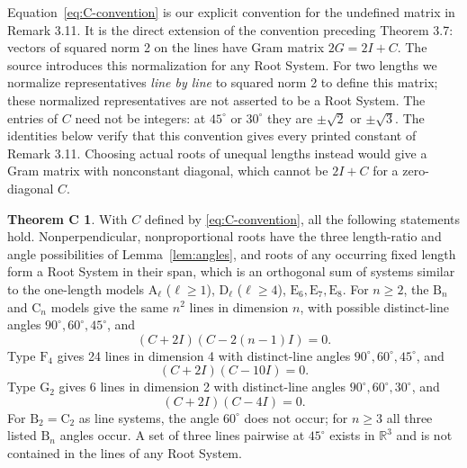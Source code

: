 \documentclass[11pt]{amsart}
\newcommand\re{{\mathbb R}}%
\theoremstyle{definition}
\newtheorem*{theoremC}{Theorem C}
\newcommand{\typ}[1]{\mathrm{#1}}
\begin{document}
Equation~\eqref{eq:C-convention} is our explicit convention for the
undefined matrix in Remark 3.11. It is the direct extension of the
convention preceding Theorem 3.7: vectors of squared norm 2 on the lines
have Gram matrix $2G=2I+C$. The source introduces this normalization
for any Root System. For two lengths we normalize representatives
\emph{line by line} to squared norm 2 to define this matrix; these
normalized representatives are not asserted to be a Root System.
The entries of $C$ need not be integers: at $45^\circ$ or $30^\circ$
they are $\pm\sqrt2$ or $\pm\sqrt3$. The identities below verify that
this convention gives every printed constant of Remark 3.11.
Choosing actual roots of unequal lengths instead would give a Gram
matrix with nonconstant diagonal, which cannot be $2I+C$ for a
zero-diagonal $C$.

\begin{theoremC}
\textup{\cite[Remark 3.11]{CGSS}}
With $C$ defined by \eqref{eq:C-convention}, all the following statements
hold. Nonperpendicular, nonproportional roots have the three length-ratio
and angle possibilities of Lemma~\ref{lem:angles}, and roots of any
occurring fixed length form a Root System in their span, which is an
orthogonal sum of systems similar to the one-length models
$\typ A_\ell$ ($\ell\geq1$), $\typ D_\ell$ ($\ell\geq4$),
$\typ E_6,\typ E_7,\typ E_8$.
For $n\geq2$, the $\typ B_n$ and $\typ C_n$ models give the same
$n^2$ lines in dimension $n$, with possible distinct-line angles
$90^\circ,60^\circ,45^\circ$, and
\[
 (C+2I)(C-2(n-1)I)=0.
\]
Type $\typ F_4$ gives 24 lines in dimension 4 with distinct-line angles
$90^\circ,60^\circ,45^\circ$, and
\[
 (C+2I)(C-10I)=0.
\]
Type $\typ G_2$ gives 6 lines in dimension 2 with distinct-line angles
$90^\circ,60^\circ,30^\circ$, and
\[
 (C+2I)(C-4I)=0.
\]
For $\typ B_2=\typ C_2$ as line systems, the angle $60^\circ$ does
not occur; for $n\geq3$ all three listed $\typ B_n$ angles occur.
A set of three lines pairwise at $45^\circ$ exists in $\re^3$ and is
not contained in the lines of any Root System.
\end{theoremC}
\end{document}
